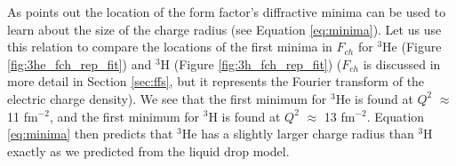 
As \cite{Book:Povh} points out the location of the form factor's diffractive minima can be used to learn about the size of the charge radius (see Equation \ref{eq:minima}). Let us use this relation to compare the locations of the first minima in $F_{ch}$ for $^3$He (Figure \ref{fig:3he_fch_rep_fit}) and $^3$H (Figure \ref{fig:3h_fch_rep_fit}) ($F_{ch}$ is discussed in more detail in Section \ref{sec:ffs}, but it represents the Fourier transform of the electric charge density). We see that the first minimum for $^3$He is found at $Q^2$ $\approx$ 11 fm$^{-2}$, and the first minimum for $^3$H is found at $Q^2$ $\approx$ 13 fm$^{-2}$. Equation \ref{eq:minima} then predicts that $^3$He has a slightly larger charge radius than $^3$H exactly as we predicted from the liquid drop model. 

 

